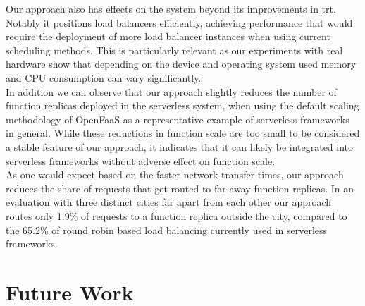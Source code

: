 \documentclass[draft,final]{vutinfth} %
\begin{document}
Our approach also has effects on the system beyond its improvements in \gls{trt}.
Notably it positions load balancers efficiently, achieving performance that would require the deployment of more load balancer instances when using current scheduling methods.
This is particularly relevant as our experiments with real hardware show that depending on the device and operating system used memory and CPU consumption can vary significantly.\\
In addition we can observe that our approach slightly reduces the number of function replicas deployed in the serverless system, when using the default scaling methodology of OpenFaaS\cite{openfaas} as a representative example of serverless frameworks in general.
While these reductions in function scale are too small to be considered a stable feature of our approach, it indicates that it can likely be integrated into serverless frameworks without adverse effect on function scale.\\
As one would expect based on the faster network transfer times, our approach reduces the share of requests that get routed to far-away function replicas.
In an evaluation with three distinct cities far apart from each other our approach routes only 1.9\% of requests to a function replica outside the city, compared to the 65.2\% of round robin based load balancing currently used in serverless frameworks.
\section{Future Work}


\end{document}
